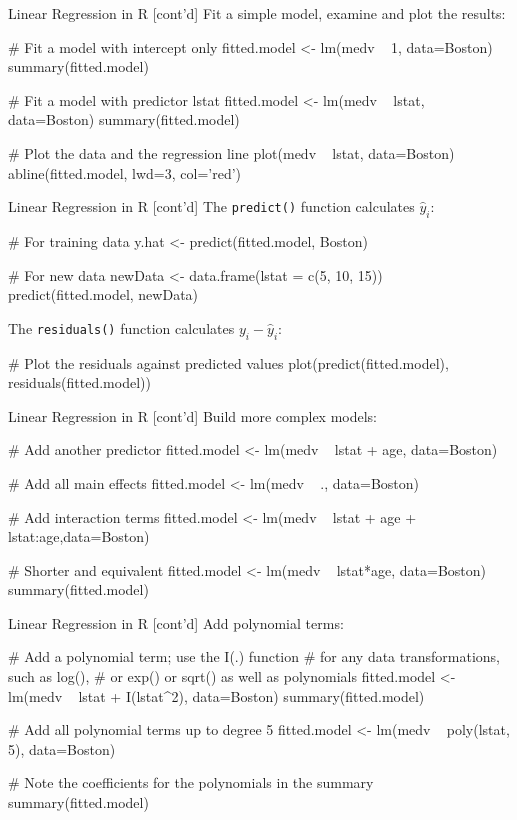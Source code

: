 \documentclass[ignorenonframetext,xcolor=x11names]{beamer}
\begin{document}
\begin{frame}[label=withcode,fragile]{Linear Regression in R \small [cont'd]}
\small
Fit a simple model, examine and plot the results:
\begin{Rcode}
# Fit a model with intercept only
fitted.model <- lm(medv ~ 1, data=Boston)
summary(fitted.model)

# Fit a model with predictor lstat
fitted.model <- lm(medv ~ lstat, data=Boston)
summary(fitted.model)

# Plot the data and the regression line
plot(medv ~ lstat, data=Boston)
abline(fitted.model, lwd=3, col='red')
\end{Rcode}
\end{frame}

\begin{frame}[label=withcode,fragile]{Linear Regression in R \small [cont'd]}
\small
The \texttt{predict()} function calculates $\hat{y}_i$:

\begin{Rcode}
# For training data
y.hat <- predict(fitted.model, Boston)

# For new data
newData <- data.frame(lstat = c(5, 10, 15))
predict(fitted.model, newData)
\end{Rcode}

The \texttt{residuals()} function calculates $y_i - \hat{y}_i$:
\begin{Rcode}
# Plot the residuals against predicted values
plot(predict(fitted.model), residuals(fitted.model))
\end{Rcode}
\end{frame}

\begin{frame}[label=withcode,fragile]{Linear Regression in R \small [cont'd]}
\small
Build more complex models:
\begin{Rcode}
# Add another predictor
fitted.model <- lm(medv ~ lstat + age, data=Boston)

# Add all main effects
fitted.model <- lm(medv ~ ., data=Boston)

# Add interaction terms
fitted.model <- lm(medv ~ lstat + age + lstat:age,data=Boston)
   
# Shorter and equivalent
fitted.model <- lm(medv ~ lstat*age, data=Boston)
summary(fitted.model)
\end{Rcode}
\end{frame}

\begin{frame}[label=withcode,fragile]{Linear Regression in R \small [cont'd]}
\small
Add polynomial terms:
\begin{Rcode}
# Add a polynomial term; use the I(.) function
# for any data transformations, such as log(),
# or exp() or sqrt() as well as polynomials
fitted.model <- lm(medv ~ lstat + I(lstat^2), data=Boston)
summary(fitted.model)

# Add all polynomial terms up to degree 5
fitted.model <- lm(medv ~ poly(lstat, 5), data=Boston)

# Note the coefficients for the polynomials in the summary
summary(fitted.model)
\end{Rcode}
\end{frame}
\end{document}
